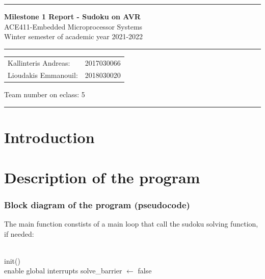 \documentclass[12pt, a4, hidelinks]{article}
\begin{document}
\noindent \rule{\textwidth}{3pt}
\begin{center}
	{\bf \Large{Milestone 1 Report - Sudoku on AVR}}\\
	ACE411-Embedded Microprocessor Systems \\
	Winter semester of academic year 2021-2022
	\rule{\textwidth}{0.2mm} 
	\begin{tabular}{l r}
		Kallinteris Andreas:& 2017030066 \\ 
		Lioudakis Emmanouil:      &2018030020 
	\end{tabular} \vrule \hspace{3mm}
	\indent	Team number on eclass:  5
	\rule{\textwidth}{1pt}
\end{center}

\section*{Introduction}


\section*{Description of the program}
\subsubsection*{Block diagram of the program (pseudocode)}
The main function constists of a main loop that call the sudoku solving function, if needed:
\begin{center}
\begin{algorithmic}
 \\
init() \\
\noindent enable global interrupts
\noindent {} 
        \State solve\_barrier $\gets$ false
\EndIf
\EndIf
\EndWhile
\EndFunction 
\end{algorithmic}
\end{center}
\end{document}
